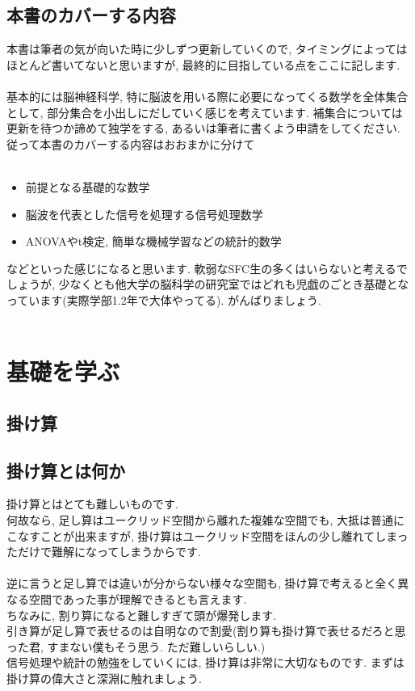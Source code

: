 \documentclass[11pt,a4paper]{jsarticle}
\begin{document}
\subsection{本書のカバーする内容}
本書は筆者の気が向いた時に少しずつ更新していくので, タイミングによってはほとんど書いてないと思いますが, 最終的に目指している点をここに記します.\\
\\
基本的には脳神経科学, 特に脳波を用いる際に必要になってくる数学を全体集合として, 部分集合を小出しにだしていく感じを考えています. 補集合については更新を待つか諦めて独学をする, あるいは筆者に書くよう申請をしてください. 従って本書のカバーする内容はおおまかに分けて\\
\\
\begin{itemize}
 \item 前提となる基礎的な数学
 \item 脳波を代表とした信号を処理する信号処理数学
 \item ANOVAやt検定, 簡単な機械学習などの統計的数学
\end{itemize}

などといった感じになると思います. 軟弱なSFC生の多くはいらないと考えるでしょうが, 少なくとも他大学の脳科学の研究室ではどれも児戯のごとき基礎となっています(実際学部1.2年で大体やってる). がんばりましょう.
\\
\\
\section{基礎を学ぶ}
\subsection{掛け算}
\subsection{掛け算とは何か}
掛け算とはとても難しいものです.\\
何故なら, 足し算はユークリッド空間から離れた複雑な空間でも, 大抵は普通にこなすことが出来ますが, 掛け算はユークリッド空間をほんの少し離れてしまっただけで難解になってしまうからです. \\
\\
逆に言うと足し算では違いが分からない様々な空間も, 掛け算で考えると全く異なる空間であった事が理解できるとも言えます. \\
ちなみに, 割り算になると難しすぎて頭が爆発します. \\
引き算が足し算で表せるのは自明なので割愛(割り算も掛け算で表せるだろと思った君, すまない僕もそう思う. ただ難しいらしい.)\\
信号処理や統計の勉強をしていくには, 掛け算は非常に大切なものです. まずは掛け算の偉大さと深淵に触れましょう.\\
\\
\end{document}
